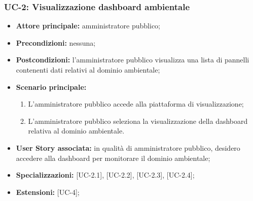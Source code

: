 \documentclass[8pt]{article}
\begin{document}
\subsubsection*{UC-2: Visualizzazione dashboard ambientale}
\begin{itemize}
    \item \textbf{Attore principale:} amministratore pubblico;
    \item \textbf{Precondizioni: }nessuna;
    \item \textbf{Postcondizioni:} l'amministratore pubblico visualizza una lista di pannelli
        contenenti dati relativi al dominio ambientale;
    \item \textbf{Scenario principale:} 
    \begin{enumerate}
    \item L’amministratore pubblico accede alla piattaforma di visualizzazione;
    \item L’amministratore pubblico seleziona la visualizzazione della dashboard relativa al dominio
        ambientale.
    \end{enumerate}
    \item \textbf{User Story associata:} in qualità di amministratore pubblico, desidero accedere alla dashboard per monitorare il dominio ambientale;
    \item \textbf {Specializzazioni:} [UC-2.1], [UC-2.2], [UC-2.3], [UC-2.4];  
    \item \textbf{Estensioni:} [UC-4];
\end{itemize}
\end{document}
